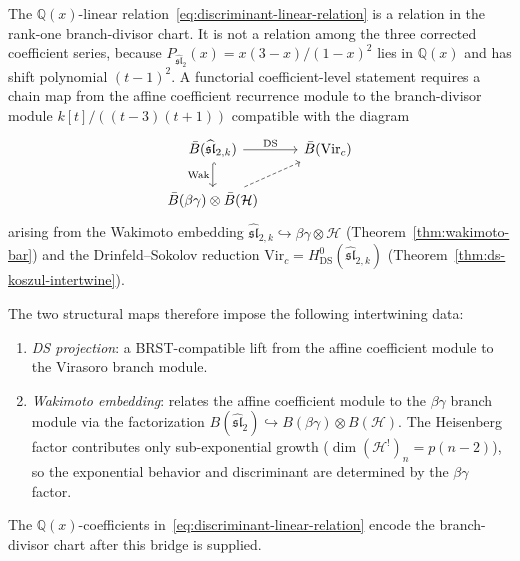 \begin{proposition}
\label{prop:linear-relation-functorial}
The $\mathbb{Q}(x)$-linear
relation~\textup{\eqref{eq:discriminant-linear-relation}} is a relation
in the rank-one branch-divisor chart.  It is not a relation among the
three corrected coefficient series, because
$P_{\widehat{\mathfrak{sl}}_2}(x)=x(3-x)/(1-x)^2$ lies in
$\mathbb{Q}(x)$ and has shift polynomial $(t-1)^2$.  A functorial
coefficient-level statement requires a chain map from the affine
coefficient recurrence module to the branch-divisor module
$k[t]/((t-3)(t+1))$ compatible with the diagram
\begin{equation}\label{eq:wakimoto-ds-triangle}
\begin{tikzcd}
\bar{B}(\widehat{\mathfrak{sl}}_{2,k})
 \ar[r, "\mathrm{DS}"]
 \ar[d, hook, "\mathrm{Wak}"']
& \bar{B}(\mathrm{Vir}_c) \\
\bar{B}(\beta\gamma) \otimes \bar{B}(\mathcal{H})
 \ar[ur, dashed]
\end{tikzcd}
\end{equation}
arising from the Wakimoto embedding
$\widehat{\mathfrak{sl}}_{2,k} \hookrightarrow
\beta\gamma \otimes \mathcal{H}$
\textup{(}Theorem~\textup{\ref{thm:wakimoto-bar})} and the
Drinfeld--Sokolov reduction
$\mathrm{Vir}_c = H^0_{\mathrm{DS}}(
\widehat{\mathfrak{sl}}_{2,k})$
\textup{(}Theorem~\textup{\ref{thm:ds-koszul-intertwine})}.

The two structural maps therefore impose the following intertwining data:
\begin{enumerate}[label=\textup{(\roman*)}]
\item \emph{DS projection}: a BRST-compatible lift from the affine
 coefficient module to the Virasoro branch module.
\item \emph{Wakimoto embedding}: relates
 the affine coefficient module to the $\beta\gamma$ branch module via
 the factorization
 $B(\widehat{\mathfrak{sl}}_2)
 \hookrightarrow B(\beta\gamma) \otimes B(\mathcal{H})$.
 The Heisenberg factor contributes only sub-exponential growth
 ($\dim (\mathcal{H}^!)_n = p(n{-}2)$), so the exponential
 behavior and discriminant are determined by the
 $\beta\gamma$ factor.
\end{enumerate}
The $\mathbb{Q}(x)$-coefficients in~\textup{\eqref{eq:discriminant-linear-relation}}
encode the branch-divisor chart after this bridge is supplied.
\end{proposition}

